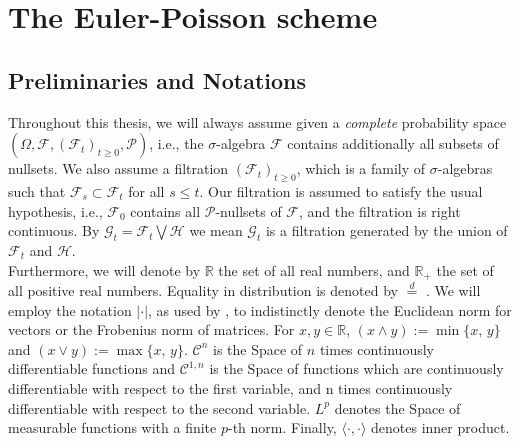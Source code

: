 \chapter{The Euler-Poisson scheme}
\section{Preliminaries and Notations}
Throughout this thesis, we will always assume given a \emph{complete} probability space \break $(\Omega , \mathcal{F}, (\mathcal{F}_t)_{t \geq 0}, \mathcal{P})$, i.e., the $\sigma$-algebra  $\mathcal{F}$ contains additionally all subsets of nullsets. We also assume a filtration $(\mathcal{F}_t)_{t \geq 0}$, which is a family of $\sigma$-algebras such that $\mathcal{F}_s \subset \mathcal{F}_t$ for all $s \leq t$. Our filtration is assumed to satisfy the usual hypothesis, i.e., $\mathcal{F}_0$ contains all $\mathcal{P}$-nullsets of $\mathcal{F}$, and the filtration is right continuous. By $\mathcal{G}_t = \mathcal{F}_t \bigvee \mathcal{H}$ we mean $\mathcal{G}_t$ is a filtration generated by the union of $\mathcal{F}_t $ and $ \mathcal{H}$.\\
Furthermore, we will denote by $\mathbb{R}$ the set of all real numbers, and $\mathbb{R}_+$ the set of all positive real numbers. Equality in distribution is denoted by $\overset{d}{=}$ .
We will employ the notation $|\cdot|$, as used by , to indistinctly denote the Euclidean norm for vectors or the Frobenius norm of matrices. For $x,y \in \mathbb{R}$, $(x \land y) := \min \{x,\, y\}$ and $(x \lor y) := \max \{x,\, y\}$. $\mathcal{C}^n$ is the Space of $n$ times continuously differentiable functions and $\mathcal{C}^{1,n}$ is the Space of functions which are continuously differentiable with respect to the first variable, and n times continuously differentiable with respect to the second variable. $L^p$ denotes the Space of measurable functions with a finite $p$-th norm. Finally, $\langle \cdot, \cdot \rangle$ denotes inner product.


